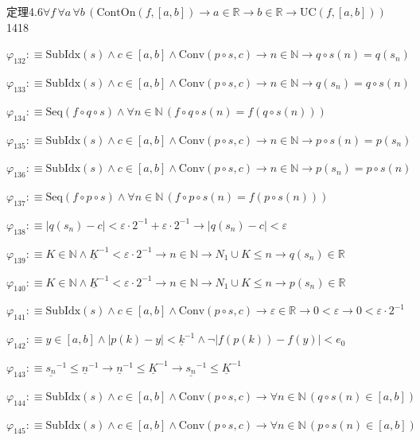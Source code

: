 \begin{fullproof}{定理4.6}{$\forall f\,\forall a\,\forall b\,(\mathrm{ContOn}(f,[a,b]) \to a \in \mathbb{R} \to b \in \mathbb{R} \to \mathrm{UC}(f,[a,b]))$}{1418}
\begin{abbrevlist}
\item $\varphi_{132} :\equiv \mathrm{SubIdx}(s) \land c \in [a,b] \land \mathrm{Conv}(p \circ s,c) \to n \in \mathbb{N} \to q \circ s(n) = q(s_{n})$
\item $\varphi_{133} :\equiv \mathrm{SubIdx}(s) \land c \in [a,b] \land \mathrm{Conv}(p \circ s,c) \to n \in \mathbb{N} \to q(s_{n}) = q \circ s(n)$
\item $\varphi_{134} :\equiv \mathrm{Seq}(f \circ q \circ s) \land \forall n \in \mathbb{N}\,(f \circ q \circ s(n) = f(q \circ s(n)))$
\item $\varphi_{135} :\equiv \mathrm{SubIdx}(s) \land c \in [a,b] \land \mathrm{Conv}(p \circ s,c) \to n \in \mathbb{N} \to p \circ s(n) = p(s_{n})$
\item $\varphi_{136} :\equiv \mathrm{SubIdx}(s) \land c \in [a,b] \land \mathrm{Conv}(p \circ s,c) \to n \in \mathbb{N} \to p(s_{n}) = p \circ s(n)$
\item $\varphi_{137} :\equiv \mathrm{Seq}(f \circ p \circ s) \land \forall n \in \mathbb{N}\,(f \circ p \circ s(n) = f(p \circ s(n)))$
\item $\varphi_{138} :\equiv \lvert q(s_{n}) - c \rvert < \varepsilon \cdot 2^{-1} + \varepsilon \cdot 2^{-1} \to \lvert q(s_{n}) - c \rvert < \varepsilon$
\item $\varphi_{139} :\equiv K \in \mathbb{N} \land \underline{K}^{-1} < \varepsilon \cdot 2^{-1} \to n \in \mathbb{N} \to N_{1} \cup K \leq n \to q(s_{n}) \in \mathbb{R}$
\item $\varphi_{140} :\equiv K \in \mathbb{N} \land \underline{K}^{-1} < \varepsilon \cdot 2^{-1} \to n \in \mathbb{N} \to N_{1} \cup K \leq n \to p(s_{n}) \in \mathbb{R}$
\item $\varphi_{141} :\equiv \mathrm{SubIdx}(s) \land c \in [a,b] \land \mathrm{Conv}(p \circ s,c) \to \varepsilon \in \mathbb{R} \to 0 < \varepsilon \to 0 < \varepsilon \cdot 2^{-1}$
\item $\varphi_{142} :\equiv y \in [a,b] \land \lvert p(k) - y \rvert < \underline{k}^{-1} \land \neg \lvert f(p(k)) - f(y) \rvert < e_{0}$
\item $\varphi_{143} :\equiv \underline{s_{n}}^{-1} \leq \underline{n}^{-1} \to \underline{n}^{-1} \leq \underline{K}^{-1} \to \underline{s_{n}}^{-1} \leq \underline{K}^{-1}$
\item $\varphi_{144} :\equiv \mathrm{SubIdx}(s) \land c \in [a,b] \land \mathrm{Conv}(p \circ s,c) \to \forall n \in \mathbb{N}\,(q \circ s(n) \in [a,b])$
\item $\varphi_{145} :\equiv \mathrm{SubIdx}(s) \land c \in [a,b] \land \mathrm{Conv}(p \circ s,c) \to \forall n \in \mathbb{N}\,(p \circ s(n) \in [a,b])$

\end{abbrevlist}
\end{fullproof}
